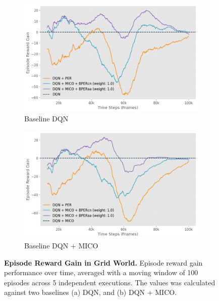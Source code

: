 \begin{figure}[!h]
    \centering
    \begin{subfigure}{0.45\textwidth}
    \includegraphics[width=\linewidth]{Results/grid_world/episode_reward_gain_baseline_dqn.png}
        \caption{Baseline DQN}
        \label{fig:episode_reward_gain_dqn}
    \end{subfigure}
    \hfill
    \begin{subfigure}{0.45\textwidth}
        \includegraphics[width=\linewidth]{Results/grid_world/episode_reward_gain_baseline_dqn_mico.png}
        \caption{Baseline DQN + MICO}
        \label{fig:episode_reward_gain_dqn_mico}
    \end{subfigure}
    \caption[Episode Reward Gain in Grid World]{\textbf{Episode Reward Gain in Grid World.} Episode reward gain performance over time, averaged with a moving window of 100 episodes across 5 independent executions. The values was calculated against two baselines (a) DQN, and (b) DQN + MICO.}
    \label{fig:episode_reward_gain_dqn_and_mico}
\end{figure}

